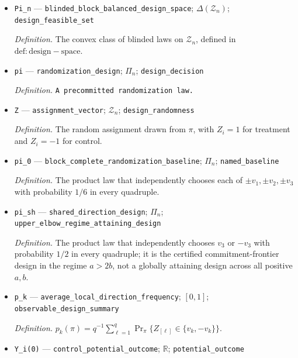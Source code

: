 \documentclass{article}
\begin{document}
\begin{itemize}
  \item \texttt{Pi\_\allowbreak{}n} --- \texttt{blinded\_\allowbreak{}block\_\allowbreak{}balanced\_\allowbreak{}design\_\allowbreak{}space}; \(\Delta(\mathcal Z_n)\); \texttt{design\_\allowbreak{}feasible\_\allowbreak{}set}
  \par\smallskip\noindent\emph{Definition.} The convex class of blinded laws on \(\mathcal Z_n\), defined in \(\mathrm{def:design-space}\).
  \item \texttt{pi} --- \texttt{randomization\_\allowbreak{}design}; \(\Pi_n\); \texttt{design\_\allowbreak{}decision}
  \par\smallskip\noindent\emph{Definition.} \texttt{A precommitted randomization law.}
  \item \texttt{Z} --- \texttt{assignment\_\allowbreak{}vector}; \(\mathcal Z_n\); \texttt{design\_\allowbreak{}randomness}
  \par\smallskip\noindent\emph{Definition.} The random assignment drawn from \(\pi\), with \(Z_i=1\) for treatment and \(Z_i=-1\) for control.
  \item \texttt{pi\_\allowbreak{}0} --- \texttt{block\_\allowbreak{}complete\_\allowbreak{}randomization\_\allowbreak{}baseline}; \(\Pi_n\); \texttt{named\_\allowbreak{}baseline}
  \par\smallskip\noindent\emph{Definition.} The product law that independently chooses each of \(\pm v_1,\pm v_2,\pm v_3\) with probability \(1/6\) in every quadruple.
  \item \texttt{pi\_\allowbreak{}sh} --- \texttt{shared\_\allowbreak{}direction\_\allowbreak{}design}; \(\Pi_n\); \texttt{upper\_\allowbreak{}elbow\_\allowbreak{}regime\_\allowbreak{}attaining\_\allowbreak{}design}
  \par\smallskip\noindent\emph{Definition.} The product law that independently chooses \(v_3\) or \(-v_3\) with probability \(1/2\) in every quadruple; it is the certified commitment-frontier design in the regime \(a>2b\), not a globally attaining design across all positive \(a,b\).
  \item \texttt{p\_\allowbreak{}k} --- \texttt{average\_\allowbreak{}local\_\allowbreak{}direction\_\allowbreak{}frequency}; \([0,1]\); \texttt{observable\_\allowbreak{}design\_\allowbreak{}summary}
  \par\smallskip\noindent\emph{Definition.} \(p_k(\pi)=q^{-1}\sum_{\ell=1}^q\Pr_\pi\{Z_{[\ell]}\in\{v_k,-v_k\}\}\).
  \item \texttt{Y\_\allowbreak{}i(0)} --- \texttt{control\_\allowbreak{}potential\_\allowbreak{}outcome}; \(\mathbb R\); \texttt{potential\_\allowbreak{}outcome}

\end{itemize}
\end{document}
